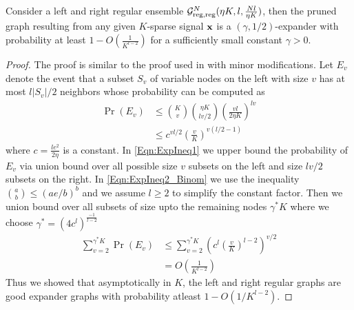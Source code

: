 \begin{lemma}\label{Lem:ExpGraph}
Consider a left and right regular ensemble $\mathcal{G}^{N}_{\text{reg,reg}}(\eta K,l,\frac{Nl}{\eta K})$, then the pruned graph resulting from any given $K$-sparse signal $\mathbf{x}$ is a $(\gamma,1/2)$-expander with probability at least $1-O\left(\frac{1}{K^{l-2}}\right)$ for a sufficiently small constant $\gamma >0$.
\end{lemma}
\begin{proof}
The proof is similar to the proof used in \cite{li2015subdraft} with minor modifications. Let $E_{v}$ denote the event that a subset $S_{v}$ of variable nodes on the left with size $v$ has at most $l|S_v|/2$ neighbors whose probability can be computed as
\begin{align}
\Pr(E_v)&\leq \binom{K}{v}\binom{\eta K}{lv/2}\left(\frac{vl}{2\eta K}\right)^{lv}\label{Eqn:ExpIneq1}\\
				&\leq c^{vl/2}\left(\frac{v}{K}\right)^{v(l/2-1)}\label{Eqn:ExpIneq2_Binom}
\end{align}
where $c=\frac{le^{2}}{2\eta}$ is a constant. In \eqref{Eqn:ExpIneq1} we upper bound the probability of $E_v$ via union bound over all possible size $v$ subsets on the left and size $lv/2$ subsets on the right. In \eqref{Eqn:ExpIneq2_Binom} we use the inequality $\binom{a}{b}\leq \left(ae/b\right)^b$ and we assume $l\geq 2$ to simplify the constant factor. Then we union bound over all subsets of size upto the remaining nodes $\gamma^{*} K$ where we choose $\gamma^{*}=\left(4c^l\right)^{\frac{-1}{l-2}}$
\begin{align*}
\sum_{v=2}^{\gamma^{*} K}\Pr(E_{v})&\leq \sum_{v=2}^{\gamma^{*} K}\left(c^{l}\left(\frac{v}{K}\right)^{l-2}\right)^{v/2}\\
														&=O\left(\frac{1}{K^{l-2}}\right)
\end{align*}
Thus we showed that asymptotically in $K$, the left and right regular graphs are good expander graphs with probability atleast $1-O(1/K^{l-2}).$
\end{proof}
\vspace{1ex}


